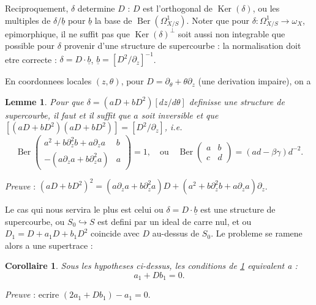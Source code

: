 \documentclass[11pt,a4paper]{article}
\theoremstyle{plain}
\newtheorem{lemma}[theorem]{Lemme}
\newtheorem{corollary}[theorem]{Corollaire}
\theoremstyle{definition}
\DeclareMathOperator{\Ker}{Ker}
\DeclareMathOperator{\Ber}{Ber}
\begin{document}
Reciproquement, $\delta$ determine $D$ : $D$ est l'orthogonal de $\Ker(\delta)$, ou les multiples de $\delta/\underline{b}$ pour $\underline{b}$ la base de $\Ber(\Omega^1_{X/S})$. Noter que pour $\delta : \Omega^1_{X/S} \to \omega_X$, epimorphique, il ne suffit pas que $\Ker(\delta)^{\perp}$ soit aussi non integrable que possible pour $\delta$ provenir d'une structure de supercourbe : la normalisation doit etre correcte : $\delta = D \cdot \underline{b}$, $\underline{b} = [D^2/\partial_z]^{-1}$.

En coordonnees locales $(z,\theta)$, pour $D = \partial_\theta + \theta\partial_z$ (une derivation impaire), on a

\begin{lemma}\label{lem1.1}
Pour que $\delta = (aD + bD^2)[dz/d\theta]$ definisse une structure de supercourbe, il faut et il suffit que $a$ soit inversible et que $[(aD+bD^2)(aD+bD^2)] = [D^2/\partial_z]$, i.e.
\begin{equation}\label{eq1.1.1}
\Ber\begin{pmatrix} a^2 + b\partial_z^2 b + a\partial_z a & b \\ -(a\partial_z a + b\partial_z^2 a) & a \end{pmatrix} = 1, \quad \text{ou} \quad \Ber\begin{pmatrix} a & b \\ c & d \end{pmatrix} = (ad - \beta\gamma)d^{-2}.
\end{equation}
\end{lemma}

\noindent \textit{Preuve} : $(aD+bD^2)^2 = (a\partial_z a + b\partial_z^2 a)D + (a^2 + b\partial_z^2 b + a\partial_z a)\partial_z$.

Le cas qui nous servira le plus est celui ou $\delta = D \cdot \underline{b}$ est une structure de supercourbe, ou $S_0 \hookrightarrow S$ est defini par un ideal de carre nul, et ou $D_1 = D + a_1 D + b_1 D^2$ coincide avec $D$ au-dessus de $S_0$. Le probleme se ramene alors a une supertrace :

\newpage

\begin{corollary}\label{cor1.2}
Sous les hypotheses ci-dessus, les conditions de \ref{lem1.1} equivalent a :
\begin{equation}\label{eq1.2.1}
a_1 + Db_1 = 0.
\end{equation}
\end{corollary}

\noindent \textit{Preuve} : ecrire $(2a_1 + Db_1) - a_1 = 0$.
\end{document}
